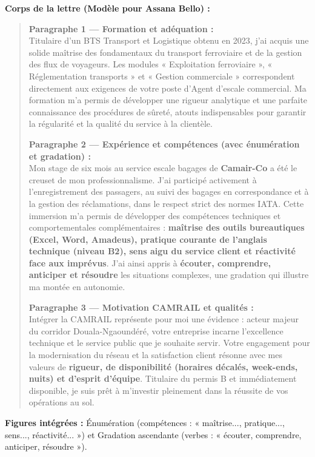 \documentclass[11pt]{article}
\newcommand{\cle}[1]{{\popxbold\color{popdark}#1}}
\begin{document}
\begin{corrige}
\textbf{Corps de la lettre (Modèle pour Assana Bello) :}
\begin{quote}
\textbf{Paragraphe 1 — Formation et adéquation :} \\
Titulaire d'un BTS Transport et Logistique obtenu en 2023, j'ai acquis une solide maîtrise des fondamentaux du transport ferroviaire et de la gestion des flux de voyageurs. Les modules « Exploitation ferroviaire », « Réglementation transports » et « Gestion commerciale » correspondent directement aux exigences de votre poste d'Agent d'escale commercial. Ma formation m'a permis de développer une rigueur analytique et une parfaite connaissance des procédures de sûreté, atouts indispensables pour garantir la régularité et la qualité du service à la clientèle.

\textbf{Paragraphe 2 — Expérience et compétences (avec énumération et gradation) :} \\
Mon stage de six mois au service escale bagages de \textbf{Camair-Co} a été le creuset de mon professionnalisme. J'ai participé activement à l'enregistrement des passagers, au suivi des bagages en correspondance et à la gestion des réclamations, dans le respect strict des normes IATA. Cette immersion m'a permis de développer des compétences techniques et comportementales complémentaires : \textbf{maîtrise des outils bureautiques (Excel, Word, Amadeus), pratique courante de l'anglais technique (niveau B2), sens aigu du service client et réactivité face aux imprévus}. J'ai ainsi appris à \textbf{écouter, comprendre, anticiper et résoudre} les situations complexes, une gradation qui illustre ma montée en autonomie.

\textbf{Paragraphe 3 — Motivation CAMRAIL et qualités :} \\
Intégrer la CAMRAIL représente pour moi une évidence : acteur majeur du corridor Douala-Ngaoundéré, votre entreprise incarne l'excellence technique et le service public que je souhaite servir. Votre engagement pour la modernisation du réseau et la satisfaction client résonne avec mes valeurs de \textbf{rigueur, de disponibilité (horaires décalés, week-ends, nuits) et d'esprit d'équipe}. Titulaire du permis B et immédiatement disponible, je suis prêt à m'investir pleinement dans la réussite de vos opérations au sol.
\end{quote}
\textbf{Figures intégrées :} \cle{Énumération} (compétences : « maîtrise..., pratique..., sens..., réactivité... ») et \cle{Gradation ascendante} (verbes : « écouter, comprendre, anticiper, résoudre »).
\end{corrige}
\end{document}
